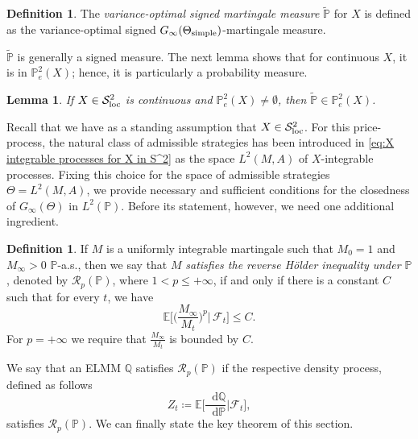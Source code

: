 \documentclass[11pt,a4paper,twoside,openany]{report}
\numberwithin{equation}{section}
\newcommand{\diff}{\mathop{}\!\mathrm{d}}
\theoremstyle{plain} %
\newtheorem{lemma}[theorem]{Lemma}
\theoremstyle{definition} %
\newtheorem{definition}[theorem]{Definition}
\theoremstyle{remark} %
\begin{document}
    \begin{definition}
        The \textit{variance-optimal signed martingale measure} \(\widetilde{\mathbb{P}}\) for \(X\) is defined as the variance-optimal signed \(G_{\infty}(\Theta_{\rm{simple}})\)-martingale measure.
    \end{definition}
    \(\widetilde{\mathbb{P}}\) is generally a signed measure. The next lemma shows that for continuous \(X\), it is in \(\mathbb{P}^2_e(X)\); hence, it is particularly a probability measure. \begin{lemma}\label{lemma:variance-optimal signed measure in P_e^2(X)}
        If \(X\in\mathcal{S}^2_{\rm{loc}}\) is continuous and \(\mathbb{P}^2_e(X)\neq \emptyset\), then \(\widetilde{\mathbb{P}}\in\mathbb{P}_e^2(X)\).
    \end{lemma}
    Recall that we have as a standing assumption that \(X\in\mathcal{S}^2_{\rm{loc}}\). For this price-process, the natural class of admissible strategies has been introduced in 
    \eqref{eq:X integrable processes for X in S^2} as the space \(L^2(M,A)\) of \(X\)-integrable processes. Fixing this choice for the space of admissible strategies \(\Theta=L^2(M,A)\), we provide necessary and sufficient conditions for the closedness of \(G_{\infty}(\Theta)\) in \(L^2(\mathbb{P})\). 
Before its statement, however, we need one additional ingredient.
\begin{definition}\label{def:reverse Hölder}
If $M$ is a uniformly integrable martingale such that $M_0=1$ and $M_{\infty}>0$ $\mathbb{P}$-a.s., then we say that
$M$ \emph{satisfies the reverse Hölder inequality under $\mathbb{P}$}, denoted by $\mathcal{R}_p(\mathbb{P})$, where
$1<p\le +\infty$, if and only if there is a constant $C$ such that for every $t$, we have
\[
\mathbb{E}\bigg[\bigg(\frac{M_{\infty}}{M_t}\bigg)^p \bigg|\, \mathcal{F}_t\bigg]\leq C.
\]
For \(p=+\infty\) we require that \(\frac{M_{\infty}}{M_t}\) is bounded by \(C\). 
\end{definition}
We say that an ELMM \(\mathbb{Q}\) satisfies \(\mathcal{R}_p(\mathbb{P})\) if the respective density process, defined as follows 
\begin{equation*}
    Z_t\coloneqq \mathbb{E}\bigg[\frac{\diff \mathbb{Q}}{\diff \mathbb{P}}\bigg|\mathcal{F}_t\bigg],
\end{equation*}
satisfies \(\mathcal{R}_p(\mathbb{P})\).
We can finally state the key theorem of this section.
\end{document}
